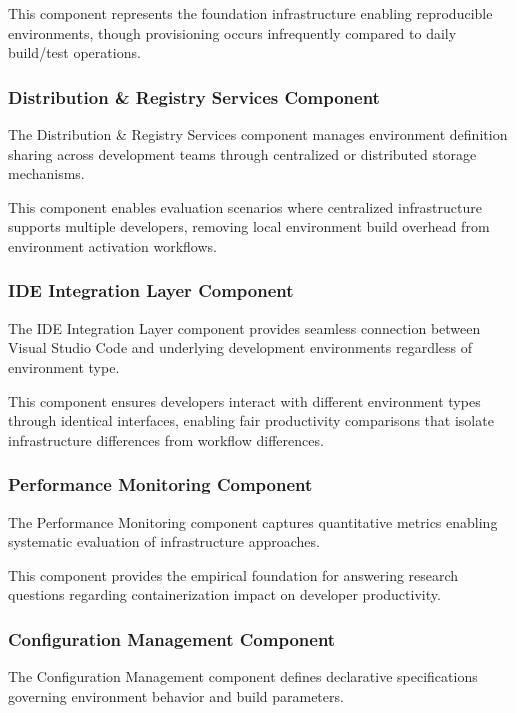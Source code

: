 This component represents the foundation infrastructure enabling reproducible environments, though provisioning occurs infrequently compared to daily build/test operations.

\subsubsection{Distribution \& Registry Services Component}

The Distribution \& Registry Services component manages environment definition sharing across development teams through centralized or distributed storage mechanisms.

This component enables evaluation scenarios where centralized infrastructure supports multiple developers, removing local environment build overhead from environment activation workflows.

\subsubsection{IDE Integration Layer Component}

The IDE Integration Layer component provides seamless connection between Visual Studio Code and underlying development environments regardless of environment type.

This component ensures developers interact with different environment types through identical interfaces, enabling fair productivity comparisons that isolate infrastructure differences from workflow differences.

\subsubsection{Performance Monitoring Component}

The Performance Monitoring component captures quantitative metrics enabling systematic evaluation of infrastructure approaches.

This component provides the empirical foundation for answering research questions regarding containerization impact on developer productivity.

\subsubsection{Configuration Management Component}

The Configuration Management component defines declarative specifications governing environment behavior and build parameters.


